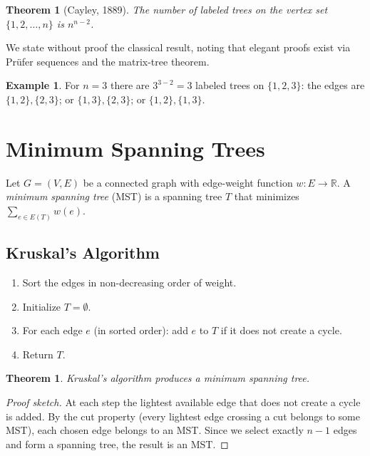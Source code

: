 \documentclass[12pt,a4paper,openany]{book}
\theoremstyle{definition}
\newtheorem{example}[definition]{Example}
\theoremstyle{plain}
\newtheorem{theorem}[definition]{Theorem}
\theoremstyle{remark}
\newcommand{\R}{\mathbb{R}}
\begin{document}
\begin{theorem}[Cayley, 1889]
\label{thm:cayley}
The number of labeled trees on the vertex set $\{1,2,\dots,n\}$ is $n^{n-2}$.
\end{theorem}

We state without proof the classical result, noting that elegant proofs
exist via Pr\"ufer sequences and the matrix-tree theorem.

\begin{example}
For $n=3$ there are $3^{3-2}=3$ labeled trees on $\{1,2,3\}$: the
edges are $\{1,2\},\{2,3\}$; or $\{1,3\},\{2,3\}$; or $\{1,2\},\{1,3\}$.
\end{example}

\section{Minimum Spanning Trees}
\label{sec:mst}

Let $G=(V,E)$ be a connected graph with edge-weight function
$w\colon E\to\R$.  A \emph{minimum spanning tree} (MST) is a spanning
tree $T$ that minimizes $\sum_{e\in E(T)}w(e)$.

\subsection{Kruskal's Algorithm}
\label{ssec:kruskal}

\begin{enumerate}
  \item Sort the edges in non-decreasing order of weight.
  \item Initialize $T=\emptyset$.
  \item For each edge $e$ (in sorted order): add $e$ to $T$ if it does
        not create a cycle.
  \item Return $T$.
\end{enumerate}

\begin{theorem}
\label{thm:kruskal-correct}
Kruskal's algorithm produces a minimum spanning tree.
\end{theorem}

\begin{proof}[Proof sketch]
At each step the lightest available edge that does not create a cycle is
added.  By the cut property (every lightest edge crossing a cut belongs
to some MST), each chosen edge belongs to an MST.  Since we select
exactly $n-1$ edges and form a spanning tree, the result is an MST.
\end{proof}
\end{document}
